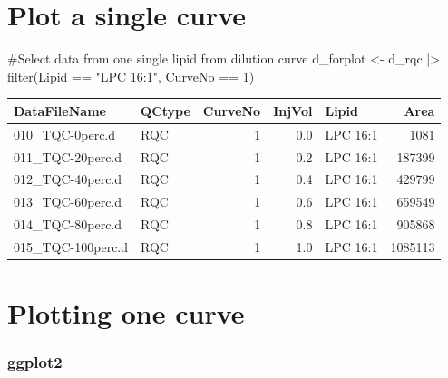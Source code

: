 \documentclass[
  letterpaper,
  DIV=11,
  numbers=noendperiod]{scrreprt}
\newenvironment{Shaded}{\begin{snugshade}}{\end{snugshade}}
\newcommand{\CommentTok}[1]{\textcolor[rgb]{0.37,0.37,0.37}{#1}}
\newcommand{\DecValTok}[1]{\textcolor[rgb]{0.68,0.00,0.00}{#1}}
\newcommand{\FunctionTok}[1]{\textcolor[rgb]{0.28,0.35,0.67}{#1}}
\newcommand{\NormalTok}[1]{\textcolor[rgb]{0.00,0.23,0.31}{#1}}
\newcommand{\OtherTok}[1]{\textcolor[rgb]{0.00,0.23,0.31}{#1}}
\newcommand{\SpecialCharTok}[1]{\textcolor[rgb]{0.37,0.37,0.37}{#1}}
\newcommand{\StringTok}[1]{\textcolor[rgb]{0.13,0.47,0.30}{#1}}
\begin{document}
\hypertarget{plot-a-single-curve}{%
\section{Plot a single curve}\label{plot-a-single-curve}}

\begin{Shaded}
\begin{Highlighting}[]
\CommentTok{\#Select data from one single lipid from dilution curve}
\NormalTok{d\_forplot }\OtherTok{\textless{}{-}}\NormalTok{ d\_rqc  }\SpecialCharTok{|\textgreater{}} \FunctionTok{filter}\NormalTok{(Lipid }\SpecialCharTok{==} \StringTok{"LPC 16:1"}\NormalTok{, CurveNo }\SpecialCharTok{==} \DecValTok{1}\NormalTok{)}
\end{Highlighting}
\end{Shaded}

\begin{longtable}[]{@{}llrrlr@{}}
\toprule()
DataFileName & QCtype & CurveNo & InjVol & Lipid & Area \\
\midrule()
\endhead
010\_TQC-0perc.d & RQC & 1 & 0.0 & LPC 16:1 & 1081 \\
011\_TQC-20perc.d & RQC & 1 & 0.2 & LPC 16:1 & 187399 \\
012\_TQC-40perc.d & RQC & 1 & 0.4 & LPC 16:1 & 429799 \\
013\_TQC-60perc.d & RQC & 1 & 0.6 & LPC 16:1 & 659549 \\
014\_TQC-80perc.d & RQC & 1 & 0.8 & LPC 16:1 & 905868 \\
015\_TQC-100perc.d & RQC & 1 & 1.0 & LPC 16:1 & 1085113 \\
\bottomrule()
\end{longtable}

\hypertarget{plotting-one-curve}{%
\section{Plotting one curve}\label{plotting-one-curve}}

\hypertarget{ggplot2-1}{%
\subsubsection{ggplot2}\label{ggplot2-1}}
\end{document}
